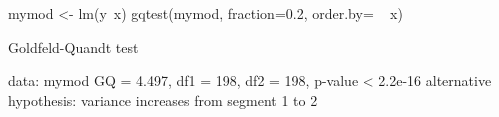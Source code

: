 \begin{Schunk}
\begin{Sinput}
 mymod <- lm(y~x)
 gqtest(mymod, fraction=0.2, order.by= ~ x)
\end{Sinput}
\begin{Soutput}
	Goldfeld-Quandt test

data:  mymod
GQ = 4.497, df1 = 198, df2 = 198, p-value < 2.2e-16
alternative hypothesis: variance increases from segment 1 to 2
\end{Soutput}
\end{Schunk}
